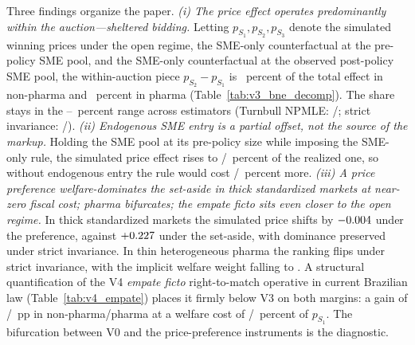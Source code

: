 Three findings organize the paper. \emph{(i) The price effect operates predominantly within the auction---sheltered bidding.} Letting $p_{S_1}, p_{S_2}, p_{S_3}$ denote the simulated winning prices under the open regime, the SME-only counterfactual at the pre-policy SME pool, and the SME-only counterfactual at the observed post-policy SME pool, the within-auction piece $p_{S_2} - p_{S_1}$ is \bneShareIntensNp~percent of the total effect in non-pharma and \bneShareIntensPh~percent in pharma (Table~\ref{tab:v3_bne_decomp}). The share stays in the \withinShareLow--\withinShareHigh~percent range across estimators (Turnbull NPMLE: \turnbullShareNp/\turnbullSharePh; strict invariance: \strictShareNp/\strictSharePh). \emph{(ii) Endogenous SME entry is a partial offset, not the source of the markup.} Holding the SME pool at its pre-policy size while imposing the SME-only rule, the simulated price effect rises to \latentShockTimesNp/\latentShockTimesPh{}~percent of the realized one, so without endogenous entry the rule would cost \latentShockRatioNp/\latentShockRatioPh{}~percent more. \emph{(iii) A \optPrefThreshold{} price preference welfare-dominates the set-aside in thick standardized markets at near-zero fiscal cost; pharma bifurcates; the empate ficto sits even closer to the open regime.} In thick standardized markets the simulated price shifts by $-0.004$ under the preference, against $+0.227$ under the set-aside, with dominance preserved under strict invariance. In thin heterogeneous pharma the ranking flips under strict invariance, with the implicit welfare weight falling to \welfWeightSiPh. A structural quantification of the V4 \emph{empate ficto} right-to-match operative in current Brazilian law (Table~\ref{tab:v4_empate}) places it firmly below V3 on both margins: a gain of \vFourSmeWinGainNp/\vFourSmeWinGainPh{}~pp in non-pharma/pharma at a welfare cost of \vFourLossPctNp/\vFourLossPctPh{}~percent of $p_{S_1}$. The bifurcation between V0 and the price-preference instruments is the diagnostic.

